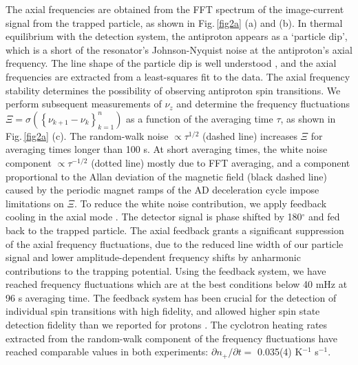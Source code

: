 \documentclass[preprint%
]{elsarticle}
\begin{document}
The axial frequencies are obtained from the FFT spectrum of the image-current signal from the trapped particle, as shown in Fig.$\,$\ref{fig2a} (a) and (b). In thermal equilibrium with the detection system, the antiproton appears as a `particle dip', which is a short of the resonator's Johnson-Nyquist noise at the antiproton's axial frequency. The line shape of the particle dip is well understood \cite{Wine}, and the axial frequencies are extracted from a least-squares fit to the data. The axial frequency stability determines the possibility of observing antiproton spin transitions. We perform subsequent measurements of $\nu_z$ and determine the frequency fluctuations $\Xi = \sigma(\left\{\nu_{k+1}-\nu_k\right\}_{k=1}^n)$ as a function of the averaging time $\tau$, as shown in Fig.$\,$\ref{fig2a} (c). The random-walk noise $\propto \tau^{1/2}$ (dashed line) increases $\Xi$ for averaging times longer than 100 s. At short averaging times, the white noise component $\propto \tau^{-1/2}$ (dotted line) mostly due to FFT averaging, and a component proportional to the Allan deviation of the magnetic field (black dashed line) caused by the periodic magnet ramps of the AD deceleration cycle impose limitations on $\Xi$. To reduce the white noise contribution, we apply feedback cooling in the axial mode \cite{CoolingMethods}. The detector signal is phase shifted by 180$^\circ$ and fed back to the trapped particle. The axial feedback grants a significant suppression of the axial frequency fluctuations, due to the reduced line width of our particle signal \cite{HiroRSI2016} and lower amplitude-dependent frequency shifts \cite{DUrso2003} by anharmonic contributions to the trapping potential. Using the feedback system, we have reached frequency fluctuations which are at the best conditions below 40 mHz at 96 s averaging time. The feedback system has been crucial for the detection of individual spin transitions with high fidelity, and allowed higher spin state detection fidelity than we reported for protons \cite{MooserPLB2013}. The cyclotron heating rates extracted from the random-walk component of the frequency fluctuations have reached comparable values in both experiments: $\partial n_+/\partial t =$ 0.035(4) K$^{-1}$ s$^{-1}$.
\end{document}
